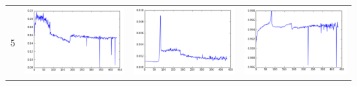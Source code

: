 \documentclass[14pt, a4paper]{extarticle}
\begin{document}
\begin{table}[!htb]
{\begin{tabular}{|c|c|c|c|}
\hline
5 & \includegraphics[scale=0.3]{images/ks_5.png} & \includegraphics[scale=0.3]{images/cvm_5.png} & \includegraphics[scale=0.3]{images/auc_5.png} \\

\end{tabular}}
\end{table}
\end{document}
